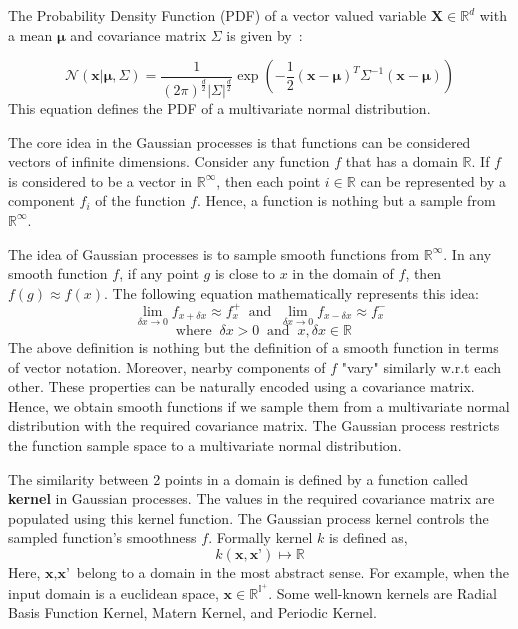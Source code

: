 \documentclass[12pt, twoside, ngerman]{report}
\begin{document}
The Probability Density Function (PDF) of a vector valued variable $\textbf{X} \in \mathbb{R}^d$ with a mean $\boldsymbol{\mu}$ and covariance matrix $\Sigma$ is given by~\cite{MITMLBook}:

$$
\mathcal{N}(\textbf{x} | \boldsymbol{\mu},  \Sigma) = 
\frac{1}{(2\pi)^{\frac{d}{2}} |\Sigma|^{\frac{d}{2}}}
\exp\left( - \frac{1}{2} (\textbf{x} - \boldsymbol{\mu})^T  \Sigma^{-1}   (\textbf{x} - \boldsymbol{\mu}) \right)
$$
This equation defines the PDF of a multivariate normal distribution.

The core idea in the Gaussian processes is that functions can be considered vectors of infinite dimensions.
Consider any function $f$ that has a domain $\mathbb{R}$.
If $f$ is considered to be a vector in $\mathbb{R}^{\infty}$,
then each point $i \in \mathbb{R}$  can be represented by a component $f_i$ of the function $f$.
Hence, a function is nothing but a sample from $\mathbb{R}^{\infty}$.

The idea of Gaussian processes is to sample smooth functions from $\mathbb{R}^{\infty}$.
In any smooth function $f$, if any point $g$ is close to $x$ in the domain of $f$, then $f(g) \approx f(x)$.
The following equation mathematically represents this idea:
$$
\lim_{\delta x \to 0} f_{x + \delta x} \approx f^{+}_x  \;\; \textrm{and} \;\; 
\lim_{\delta x \to 0} f_{x - \delta x} \approx f^{-}_x 
$$
$$\;\; \textrm{where} \;\; \delta x > 0 \;\; \textrm{and} \;\; x, \delta x \in \mathbb{R}
$$
The above definition is nothing but the definition of a smooth function in terms of vector notation. 
Moreover, nearby components of $f$ "vary" similarly w.r.t each other.
These properties can be naturally encoded using a covariance matrix.
Hence, we obtain smooth functions if we sample them from a multivariate normal distribution with the required covariance matrix.
The Gaussian process restricts the function sample space to a multivariate normal distribution.

The similarity between 2 points in a domain is defined by a function called \textbf{kernel} in Gaussian processes.
The values in the required covariance matrix are populated using this kernel function.
The Gaussian process kernel controls the sampled function's smoothness $f$.
Formally kernel $k$ is defined as,
$$
k(\textbf{x}, \textbf{x'}) \mapsto \mathbb{R}
$$
Here, $\textbf{x}, \textbf{x'}$ belong to a domain in the most abstract sense.
For example,  when the input domain is a euclidean space,  $\textbf{x} \in \mathbb{R}^{\mathbb{I}^+}$.
Some well-known kernels are Radial Basis Function Kernel,  Matern Kernel,  and Periodic Kernel.
\end{document}
